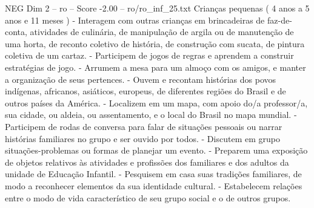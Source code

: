 \begin{textsample}{NEG Dim 2 – ro – Score -2.00 – ro/ro\_inf\_25.txt}  \label{ex:f2_neg_108}
Crianças pequenas ( 4 anos a 5 anos e 11 meses ) - Interagem com outras crianças em brincadeiras de faz-de-conta, atividades de culinária, de manipulação de argila ou de manutenção de uma horta, de reconto coletivo de história, de construção com sucata, de pintura coletiva de um cartaz. - Participem de jogos de regras e aprendem a construir estratégias de jogo. - Arrumem a mesa para um almoço com os amigos, e manter a organização de seus pertences. - Ouvem e recontam histórias dos povos indígenas, africanos, asiáticos, europeus, de diferentes regiões do Brasil e de outros países da América. - Localizem em um mapa, com apoio do/a professor/a, sua cidade, ou aldeia, ou assentamento, e o local do Brasil no mapa mundial. - Participem de rodas de conversa para falar de situações pessoais ou narrar histórias familiares no grupo e ser ouvido por todos. - Discutem em grupo situações-problemas ou formas de planejar um evento. - Preparem uma exposição de objetos relativos às atividades e profissões dos familiares e dos adultos da unidade de Educação Infantil. - Pesquisem em casa suas tradições familiares, de modo a reconhecer elementos da sua identidade cultural. - Estabelecem relações entre o modo de vida característico de seu grupo social e o de outros grupos.

\end{textsample}
